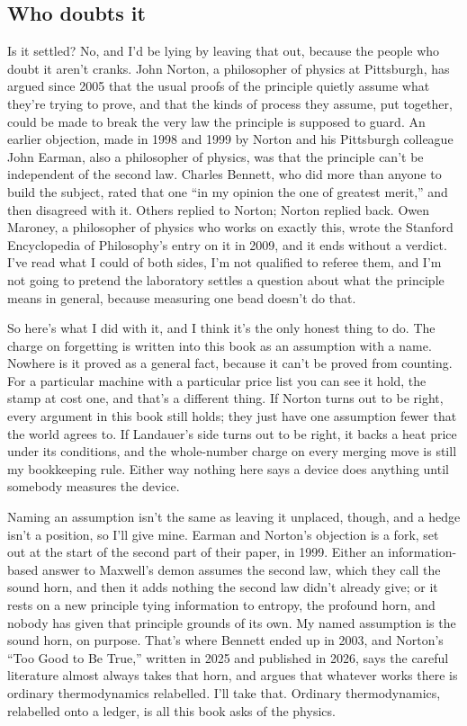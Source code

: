 \documentclass[11pt,twoside]{article}
\theoremstyle{thielethm}
\theoremstyle{thieledef}
\theoremstyle{thieledef}
\theoremstyle{thieledef}
\theoremstyle{thielethm}
\theoremstyle{thieleobs}
\theoremstyle{thielethm}
\begin{document}
\subsection{Who doubts it}

Is it settled? No, and I'd be lying by leaving that out, because the people who doubt it aren't cranks. John Norton, a philosopher of physics at Pittsburgh, has argued since 2005 that the usual proofs of the principle quietly assume what they're trying to prove, and that the kinds of process they assume, put together, could be made to break the very law the principle is supposed to guard. An earlier objection, made in 1998 and 1999 by Norton and his Pittsburgh colleague John Earman, also a philosopher of physics, was that the principle can't be independent of the second law. Charles Bennett, who did more than anyone to build the subject, rated that one ``in my opinion the one of greatest merit,'' and then disagreed with it. Others replied to Norton; Norton replied back. Owen Maroney, a philosopher of physics who works on exactly this, wrote the Stanford Encyclopedia of Philosophy's entry on it in 2009, and it ends without a verdict. I've read what I could of both sides, I'm not qualified to referee them, and I'm not going to pretend the laboratory settles a question about what the principle means in general, because measuring one bead doesn't do that.

So here's what I did with it, and I think it's the only honest thing to do. The charge on forgetting is written into this book as an assumption with a name. Nowhere is it proved as a general fact, because it can't be proved from counting. For a particular machine with a particular price list you can see it hold, the stamp at cost one, and that's a different thing. If Norton turns out to be right, every argument in this book still holds; they just have one assumption fewer that the world agrees to. If Landauer's side turns out to be right, it backs a heat price under its conditions, and the whole-number charge on every merging move is still my bookkeeping rule. Either way nothing here says a device does anything until somebody measures the device.

Naming an assumption isn't the same as leaving it unplaced, though, and a hedge isn't a position, so I'll give mine. Earman and Norton's objection is a fork, set out at the start of the second part of their paper, in 1999. Either an information-based answer to Maxwell's demon assumes the second law, which they call the sound horn, and then it adds nothing the second law didn't already give; or it rests on a new principle tying information to entropy, the profound horn, and nobody has given that principle grounds of its own. My named assumption is the sound horn, on purpose. That's where Bennett ended up in 2003, and Norton's ``Too Good to Be True,'' written in 2025 and published in 2026, says the careful literature almost always takes that horn, and argues that whatever works there is ordinary thermodynamics relabelled. I'll take that. Ordinary thermodynamics, relabelled onto a ledger, is all this book asks of the physics.
\end{document}
